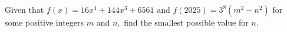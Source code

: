Given that $f(x)=16x^4+144x^3+6561$ and $f(2025)=3^8(m^2-n^2)$ for some positive integers $m$ and $n,$ find the smallest possible value for $n.$
